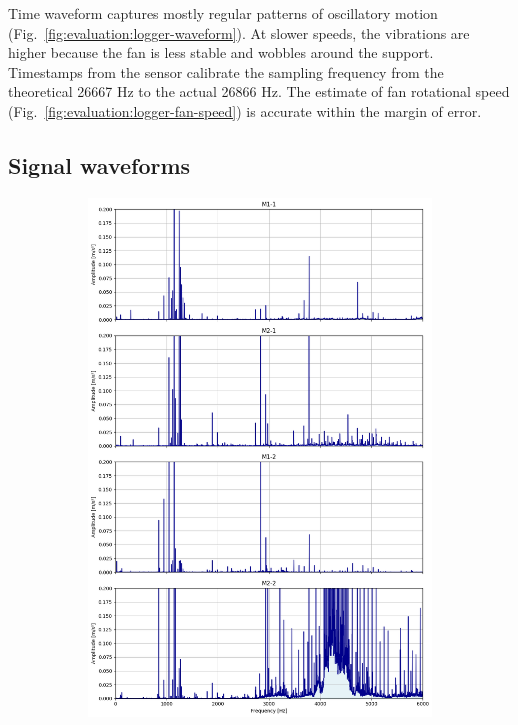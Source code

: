Time waveform captures mostly regular patterns of oscillatory motion  (Fig.~\ref{fig:evaluation:logger-waveform}). At slower speeds, the vibrations are higher because the fan is less stable and wobbles around the support. Timestamps from the sensor calibrate the sampling frequency from the theoretical 26667 Hz to the actual 26866 Hz. The estimate of fan rotational speed (Fig.~\ref{fig:evaluation:logger-fan-speed}) is accurate within the margin of error.

\subsection{Signal waveforms}
\begin{figure}[h]
    \centering
    \begin{subfigure}[b]{0.32\textwidth}
        \includegraphics[width=\textwidth]{assets/results/eda/frequency-spectrum-motors.png}

\end{subfigure}
\end{figure}
